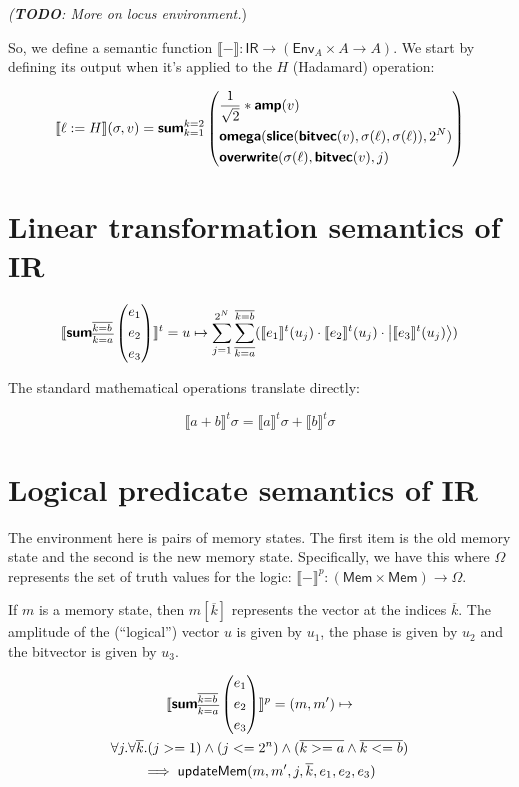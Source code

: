 \documentclass[runningheads]{llncs}
\newcommand {\ra} {\rightarrow}
\newcommand {\Env} {\textsf{Env}}
\newcommand {\sem} [1] {\llbracket #1 \rrbracket}
\newcommand {\Psem} [1] {\sem{#1}^p}
\newcommand {\Tsem} [1] {\sem{#1}^t}
\newcommand {\Mem} {\textsf{Mem}}
\newcommand {\ket}[1]{\ensuremath{\left|#1\right\rangle}}
\newcommand {\ir} [1] {\textsf{\textbf{#1}}}
\newcommand {\IRep} {\textsf{IR}}
\newcommand {\irSum} {\ir{sum}}
\newcommand {\irOverwrite} {\ir{overwrite}}
\newcommand {\irSlice} {\ir{slice}}
\newcommand {\irAmp} {\ir{amp}}
\newcommand {\irBV} {\ir{bitvec}}
\newcommand {\irOmega} {\ir{omega}}
\newcommand {\updateMem} {\textsf{updateMem}}
\newcommand {\truthVals} {\Omega}
\begin{document}
\textit{(\textbf{TODO}: More on locus environment.})

So, we define a semantic function $\sem{-} : \IRep \ra (\Env_A \times A \ra A)$. We start by defining its output when it's applied to the $H$ (Hadamard) operation:

\[
  \sem{\ell := H}(\sigma, v) = \irSum_{k=1}^{k=2}
    \left(\begin{aligned}
      &\frac{1}{\sqrt{2}} * \irAmp(v)\\
      &\irOmega(\irSlice(\irBV(v), \sigma(\ell), \sigma(\ell)), 2^N)\\
      &\irOverwrite(\sigma(\ell), \irBV(v), j)
      \end{aligned}\right)
\]

\section{Linear transformation semantics of IR}

\[
  \Tsem{\irSum_{\overline{k=a}}^{\overline{k=b}}
    \left(\begin{aligned}
      &e_1\\
      &e_2\\
      &e_3
    \end{aligned}\right)}
    =
    u \mapsto \sum_{j=1}^{2^N}\sum_{\overline{k=a}}^{\overline{k=b}} (\Tsem{e_1}(u_j) \cdot \Tsem{e_2}(u_j) \cdot \ket{\Tsem{e_3}(u_j)})
\]

\noindent
The standard mathematical operations translate directly:

\[
  \Tsem{a + b}\sigma = \Tsem{a}\sigma + \Tsem{b}\sigma
\]

\section{Logical predicate semantics of IR}

The environment here is pairs of memory states. The first item is the old memory state and the second is the new memory state. Specifically, we have this where $\truthVals$ represents the set of truth values for the logic: $\Psem{-} : (\Mem \times \Mem) \ra \truthVals$.

If $m$ is a memory state, then $m[\overline{k}]$ represents the vector at the indices $\overline{k}$. The amplitude of the (``logical'') vector $u$ is given by $u_1$, the phase is given by $u_2$ and the bitvector is given by $u_3$.

\begin{multline*}
  \Psem{\irSum_{\overline{k=a}}^{\overline{k=b}}
    \left(\begin{aligned}
      &e_1\\
      &e_2\\
      &e_3
    \end{aligned}\right)} = (m, m') \mapsto \\
    \forall j. \forall \overline{k}. (j >= 1) \land (j <= 2^n) \land (\overline{k >= a} \land \overline{k <= b})\\
    \implies \updateMem(m, m', j, \overline{k}, e_1, e_2, e_3)
\end{multline*}
\end{document}
